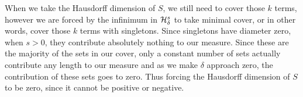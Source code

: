 When we take the Hausdorff dimension of $S$, we still need to cover those $k$ terms, however we are forced by the infinimum in $\mathcal{H}^s_\delta$ to take minimal cover, or in other words, cover those $k$ terms with singletons.
Since singletons have diameter zero, when $s>0$, they contribute absolutely nothing to our measure.
Since these are the majority of the sets in our cover, only a constant number of sets actually contribute any length to our measure and as we make $\delta$ approach zero, the contribution of these sets goes to zero.
Thus forcing the Hausdorff dimension of $S$ to be zero, since it cannot be positive or negative.
